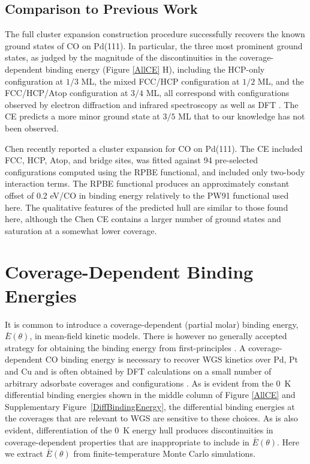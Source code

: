 \documentclass[11pt]{article}
\begin{document}
\subsection{Comparison to Previous Work}

The full cluster expansion construction procedure successfully recovers the known ground states of CO on Pd(111).  In particular, the three most prominent ground states, as judged by the magnitude of the discontinuities in the coverage-dependent binding energy (Figure \ref{AllCE} H), including the HCP-only configuration at $1/3$ ML, the mixed FCC/HCP configuration at $1/2$ ML, and the FCC/HCP/Atop configuration at $3/4$ ML, all correspond with configurations observed by electron diffraction \cite{Ohtani1987, Surnev2000, Schaff1998} and infrared spectroscopy \cite{Bradshaw1978, Hoffmann1983} as well as DFT \cite{Lo1999, Martin2014, Rose2002}.  The CE predicts a more minor ground state at $3/5$ ML that to our knowledge has not been observed. 

Chen \cite{Chen2012} recently reported a cluster expansion for CO on Pd(111).  The CE included FCC, HCP, Atop, and bridge sites, was fitted against 94 pre-selected configurations computed using the RPBE functional, and included only two-body interaction terms. The RPBE functional produces an approximately constant offset of 0.2 eV/CO in binding energy relatively to the PW91 functional used here.\cite{Herron2012}  The qualitative features of the predicted hull are similar to those found here, although the Chen CE contains a larger number of ground states and saturation at a somewhat lower coverage. 

\section{Coverage-Dependent Binding Energies}

It is common to introduce a coverage-dependent (partial molar) binding energy, $\bar{E}(\theta)$, in mean-field kinetic models. There is however no generally accepted strategy for obtaining the binding energy from first-principles \cite{Grabow2008, Gokhale2008, Stamatakis2011a, Stamatakis2011, Getman2010, Park1999, Aghalayam2003, Hansgen2010, Aghalayam2000}. A coverage-dependent CO binding energy is necessary to recover WGS kinetics over Pd, Pt and Cu and is often obtained by DFT calculations on a small number of arbitrary adsorbate coverages and configurations \cite{Grabow2008, Gokhale2008, Stamatakis2011a, Stamatakis2011}. As is evident from the 0~K differential binding energies shown in the middle column of Figure \ref{AllCE} and Supplementary Figure~\ref{DiffBindingEnergy}, the differential binding energies at the coverages that are relevant to WGS are sensitive to these choices.  As is also evident, differentiation of the 0~K energy hull produces discontinuities in coverage-dependent properties that are inappropriate to include in $\bar{E}(\theta)$.  Here we extract $\bar{E}(\theta)$ from finite-temperature Monte Carlo simulations.
\end{document}
